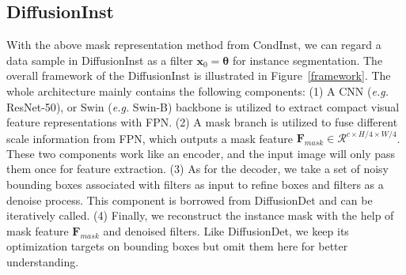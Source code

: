 \documentclass{article}
\begin{document}
\subsection{DiffusionInst}
With the above mask representation method from CondInst, we can regard a data sample in DiffusionInst as a filter $\mathbf{x}_0=\bm{\theta}$ for instance segmentation. The overall framework of the DiffusionInst is illustrated in Figure~\ref{framework}. The whole architecture mainly contains the following components: (1) A CNN (\emph{e.g.} ResNet-50\cite{ResNet}), or Swin (\emph{e.g.} Swin-B\cite{swin}) backbone is utilized to extract compact visual feature representations with FPN\cite{FPN}. (2) A mask branch is utilized to fuse different scale information from FPN, which outputs a mask feature $\mathbf{{F}}_{mask}\in \mathcal{R}^{c\times H/4\times W/4}$. These two components work like an encoder, and the input image will only pass them once for feature extraction. (3) As for the decoder, we take a set of noisy bounding boxes associated with filters as input to refine boxes and filters as a denoise process. This component is borrowed from DiffusionDet and can be iteratively called. (4) Finally, we reconstruct the instance mask with the help of mask feature $\mathbf{{F}}_{mask}$ and denoised filters. Like DiffusionDet, we keep its optimization targets on bounding boxes but omit them here for better understanding. 
\end{document}
